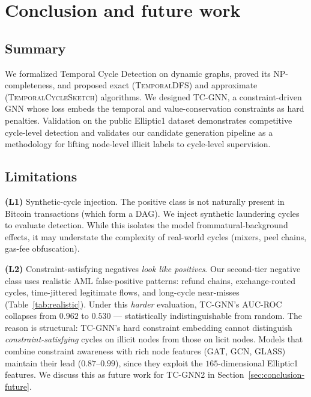 \documentclass[journal,onecolumn]{IEEEtran}
\begin{document}
\section{Conclusion and future work}
\label{sec:conclusion}

\subsection{Summary}
\label{sec:conclusion-summary}

We formalized Temporal Cycle Detection on dynamic graphs, proved its
NP-completeness, and proposed exact (\textsc{TemporalDFS}) and approximate
(\textsc{TemporalCycleSketch}) algorithms. We designed \textsc{TC-GNN}, a
constraint-driven GNN whose loss embeds the temporal and value-conservation
constraints as hard penalties. Validation on the public Elliptic1 dataset
demonstrates competitive cycle-level detection and validates our candidate
generation pipeline as a methodology for lifting node-level illicit labels
to cycle-level supervision.

\subsection{Limitations}
\label{sec:conclusion-limit}

\textbf{(L1)} Synthetic-cycle injection. The positive class is not
naturally present in Bitcoin transactions (which form a DAG). We inject
synthetic laundering cycles to evaluate detection. While this isolates
the model frommatural-background effects, it may understate the
complexity of real-world cycles (mixers, peel chains, gas-fee obfuscation).

\textbf{(L2)} Constraint-satisfying negatives \emph{look like positives}.
Our second-tier negative class uses realistic AML false-positive patterns:
refund chains, exchange-routed cycles, time-jittered legitimate flows,
and long-cycle near-misses (Table~\ref{tab:realistic}). Under this
\emph{harder} evaluation, TC-GNN's AUC-ROC collapses from $0.962$ to
$0.530$ --- statistically indistinguishable from random. The reason
is structural: TC-GNN's hard constraint embedding cannot distinguish
\emph{constraint-satisfying} cycles on illicit nodes from those on
licit nodes. Models that combine constraint awareness with rich node
features (GAT, GCN, GLASS) maintain their lead ($0.87$--$0.99$), since
they exploit the $165$-dimensional Elliptic1 features. We discuss this
as future work for \textsc{TC-GNN}2 in Section~\ref{sec:conclusion-future}.
\end{document}
